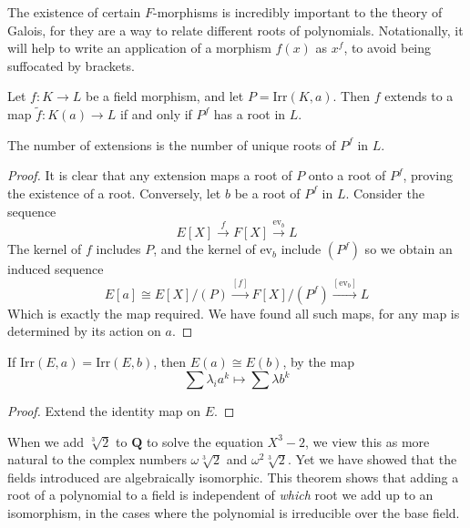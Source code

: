 The existence of certain $F$-morphisms is incredibly important to the theory of Galois, for they are a way to relate different roots of polynomials. Notationally, it will help to write an application of a morphism $f(x)$ as $x^f$, to avoid being suffocated by brackets.

\begin{lemma}
    Let $f:K \to L$ be a field morphism, and let $P = \text{Irr}(K,a)$. Then $f$ extends to a map $\tilde{f}:K(a) \to L$ if and only if $P^f$ has a root in $L$.
    \begin{center}
    \end{center}
    The number of extensions is the number of unique roots of $P^f$ in $L$.
\end{lemma}
\begin{proof}
    It is clear that any extension maps a root of $P$ onto a root of $P^f$, proving the existence of a root. Conversely, let $b$ be a root of $P^f$ in $L$. Consider the sequence
    \[ E[X] \xrightarrow{f} F[X] \xrightarrow{\text{ev}_b} L \]
    The kernel of $f$ includes $P$, and the kernel of $\text{ev}_b$ include $(P^f)$ so we obtain an induced sequence
    \[ E[a] \cong E[X]/(P) \xrightarrow{[f]} F[X]/(P^f) \xrightarrow{[\text{ev}_b]} L \]
    Which is exactly the map required. We have found all such maps, for any map is determined by its action on $a$.
\end{proof}

\begin{corollary}
    If $\text{Irr}(E,a) = \text{Irr}(E,b)$, then $E(a) \cong E(b)$, by the map
    \[ \sum \lambda_i a^k \mapsto \sum \lambda b^k \]
\end{corollary}
\begin{proof}
    Extend the identity map on $E$.
\end{proof}

When we add $\sqrt[3]{2}$ to $\mathbf{Q}$ to solve the equation $X^3 - 2$, we view this as more natural to the complex numbers $\omega \sqrt[3]{2}$ and $\omega^2 \sqrt[3]{2}$. Yet we have showed that the fields introduced are algebraically isomorphic. This theorem shows that adding a root of a polynomial to a field is independent of {\it which} root we add up to an isomorphism, in the cases where the polynomial is irreducible over the base field.

